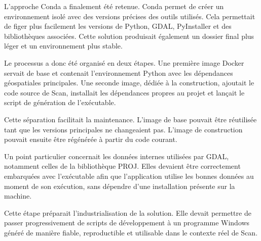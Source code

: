 L'approche Conda a finalement été retenue. Conda permet de créer un
environnement isolé avec des versions précises des outils utilisés. Cela
permettait de figer plus facilement les versions de Python, GDAL, PyInstaller et
des bibliothèques associées. Cette solution produisait également un dossier
final plus léger et un environnement plus stable.

Le processus a donc été organisé en deux étapes. Une première image Docker
servait de base et contenait l'environnement Python avec les dépendances
géospatiales principales. Une seconde image, dédiée à la construction, ajoutait
le code source de Scan, installait les dépendances propres au projet et lançait
le script de génération de l'exécutable.

Cette séparation facilitait la maintenance. L'image de base pouvait être
réutilisée tant que les versions principales ne changeaient pas. L'image de
construction pouvait ensuite être régénérée à partir du code courant.

Un point particulier concernait les données internes utilisées par GDAL,
notamment celles de la bibliothèque PROJ. Elles devaient être correctement
embarquées avec l'exécutable afin que l'application utilise les bonnes données
au moment de son exécution, sans dépendre d'une installation présente sur la
machine.

Cette étape préparait l'industrialisation de la solution. Elle devait permettre
de passer progressivement de scripts de développement à un programme Windows
généré de manière fiable, reproductible et utilisable dans le contexte réel de
Scan.

